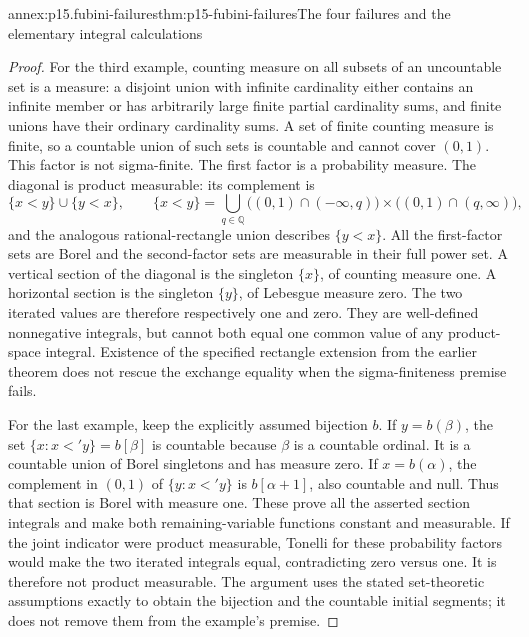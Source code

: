 \begin{annexitem}{annex:p15.fubini-failures}{thm:p15-fubini-failures}{The four failures and the elementary integral calculations}
\begin{proof}
For the third example, counting measure on all subsets of an
uncountable set is a measure: a disjoint union with infinite cardinality
either contains an infinite member or has arbitrarily large finite
partial cardinality sums, and finite unions have their ordinary
cardinality sums. A set of finite counting measure is finite, so a
countable union of such sets is countable and cannot cover \((0,1)\).
This factor is not sigma-finite. The first factor is a probability
measure. The diagonal is product measurable: its complement is
\[
 \{x<y\}\cup\{y<x\},\qquad
 \{x<y\}=\bigcup_{q\in\mathbb Q}
     \bigl((0,1)\cap(-\infty,q)\bigr)
       \times\bigl((0,1)\cap(q,\infty)\bigr),
\]
and the analogous rational-rectangle union describes \(\{y<x\}\).
All the first-factor sets are Borel and the second-factor sets are
measurable in their full power set. A vertical section of the diagonal
is the singleton \(\{x\}\), of counting measure one. A horizontal
section is the singleton \(\{y\}\), of Lebesgue measure zero.
The two iterated values are therefore respectively one and zero.
They are well-defined nonnegative integrals, but cannot both equal
one common value of any product-space integral. Existence of the
specified rectangle extension from the earlier theorem does not
rescue the exchange equality when the sigma-finiteness premise fails.

For the last example, keep the explicitly assumed bijection \(b\).
If \(y=b(\beta)\), the set \(\{x:x<'y\}=b[\beta]\) is
countable because \(\beta\) is a countable ordinal. It is a
countable union of Borel singletons and has measure zero. If
\(x=b(\alpha)\), the complement in \((0,1)\) of
\(\{y:x<'y\}\) is \(b[\alpha+1]\), also countable and null.
Thus that section is Borel with measure one. These prove all the
asserted section integrals and make both remaining-variable functions
constant and measurable. If the joint indicator were product measurable,
Tonelli for these probability factors would make the two iterated
integrals equal, contradicting zero versus one. It is therefore not
product measurable. The argument uses the stated set-theoretic
assumptions exactly to obtain the bijection and the countable initial
segments; it does not remove them from the example's premise.
\end{proof}
\end{annexitem}

